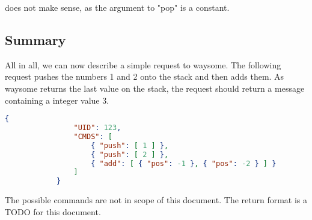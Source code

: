         does not make sense, as the argument to "pop" is a constant.

    \subsection{Summary}

        All in all, we can now describe a simple request to waysome. The
        following request pushes the numbers 1 and 2 onto the stack and then
        adds them. As waysome returns the last value on the stack, the request
        should return a message containing a integer value 3.

        \begin{lstlisting}[language=json]
            {
                "UID": 123,
                "CMDS": [
                    { "push": [ 1 ] },
                    { "push": [ 2 ] },
                    { "add": [ { "pos": -1 }, { "pos": -2 } ] }
                ]
            }
        \end{lstlisting}

        The possible commands are not in scope of this document.
        The return format is a TODO for this document.
